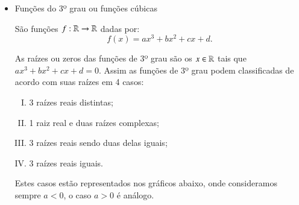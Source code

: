 \begin{itemize}
 \newpage
 \item Funções do 3º grau ou funções cúbicas

 São funções $f: \mathbb{R} \rightarrow \mathbb{R}$ dadas por:
 \[f(x)= ax^3 + bx^2 + cx + d .\]
 
 As raízes ou zeros das funções de 3º grau são os $x \in \mathbb{R}$ tais que $ax^3 + bx^2 + cx + d=0$. Assim as funções de 3º grau podem classificadas de acordo com suas raízes em 4 casos:
 \begin{enumerate}[(I)]
  \item 3 raízes reais distintas;
  \item 1 raiz real e duas raízes complexas;
  \item 3 raízes reais sendo duas delas iguais;
  \item 3 raízes reais iguais.
 \end{enumerate}
 Estes casos estão representados nos gráficos abaixo, onde consideramos sempre $a< 0$, o caso $a> 0$ é análogo.


   \begin{figure}[H]
   \end{figure}
   

\end{itemize}
